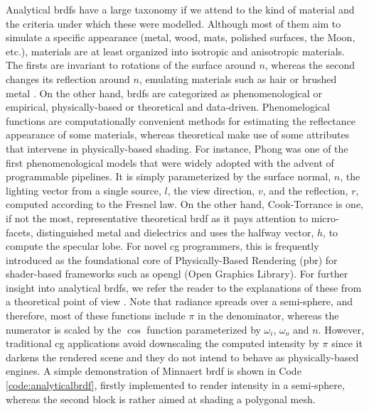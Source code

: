 Analytical \acrshort{brdf}s have a large taxonomy if we attend to the kind of material and the criteria under which these were modelled. Although most of them aim to simulate a specific appearance (metal, wood, mats, polished surfaces, the Moon, etc.), materials are at least organized into isotropic and anisotropic materials. The firsts are invariant to rotations of the surface around $n$, whereas the second changes its reflection around $n$, emulating materials such as hair or brushed metal \cite{guarnera_brdf_2016}. On the other hand, \acrshort{brdf}s are categorized as phenomenological or empirical, physically-based or theoretical and data-driven. Phenomelogical functions are computationally convenient methods for estimating the reflectance appearance of some materials, whereas theoretical make use of some attributes that intervene in physically-based shading. For instance, Phong was one of the first phenomenological models that were widely adopted with the advent of programmable pipelines. It is simply parameterized by the surface normal, $n$, the lighting vector from a single source, $l$, the view direction, $v$, and the reflection, $r$, computed according to the Fresnel law. On the other hand, Cook-Torrance is one, if not the most, representative theoretical \acrshort{brdf} as it pays attention to micro-facets, distinguished metal and dielectrics and uses the halfway vector, $h$, to compute the specular lobe. For novel \acrshort{cg} programmers, this is frequently introduced as the foundational core of Physically-Based Rendering (\acrshort{pbr}) for shader-based frameworks such as \acrshort{opengl} (Open Graphics Library). For further insight into analytical \acrshort{brdf}s, we refer the reader to the explanations of these from a theoretical point of view \cite{guarnera_brdf_2016, soldado_overview_2012}. Note that radiance spreads over a semi-sphere, and therefore, most of these functions include $\pi$ in the denominator, whereas the numerator is scaled by the $\cos$ function parameterized by $\omega_i$, $\omega_o$ and $n$. However, traditional \acrshort{cg} applications avoid downscaling the computed intensity by $\pi$ since it darkens the rendered scene and they do not intend to behave as physically-based engines. A simple demonstration of Minnaert \acrshort{brdf} is shown in Code \ref{code:analyticalbrdf}, firstly implemented to render intensity in a semi-sphere, whereas the second block is rather aimed at shading a polygonal mesh.



